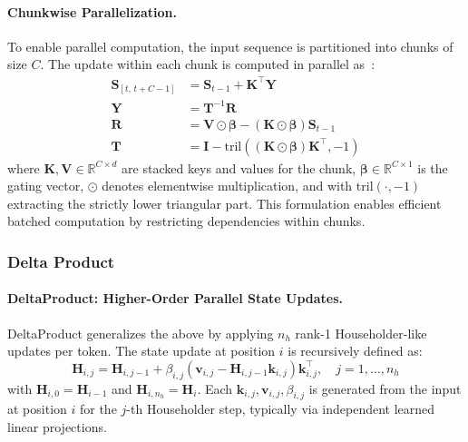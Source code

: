 \documentclass[10pt,a4paper]{article}
\begin{document}
\paragraph{Chunkwise Parallelization.}

To enable parallel computation, the input sequence is partitioned into chunks of size $C$. The update within each chunk is computed in parallel as~\cite{yang2024parallelizing}:
\begin{align}
    \mathbf{S}_{[t,\,t+C-1]} &= \mathbf{S}_{t-1} + \mathbf{K}^\top \mathbf{Y} \\
    \mathbf{Y} &= \mathbf{T}^{-1} \mathbf{R} \\
    \mathbf{R} &= \mathbf{V} \odot \boldsymbol{\beta} - (\mathbf{K} \odot \boldsymbol{\beta}) \mathbf{S}_{t-1} \\ 
    \mathbf{T} &= \mathbf{I} - \mathrm{tril}\left((\mathbf{K} \odot \boldsymbol{\beta}) \mathbf{K}^\top, -1\right)
\end{align}
where $\mathbf{K}, \mathbf{V} \in \mathbb{R}^{C \times d}$ are stacked keys and values for the chunk, $\boldsymbol{\beta} \in \mathbb{R}^{C \times 1}$ is the gating vector, $\odot$ denotes elementwise multiplication, and with $\mathrm{tril}(\cdot, -1)$ extracting the strictly lower triangular part. This formulation enables efficient batched computation by restricting dependencies within chunks.


\subsubsection{Delta Product}

\paragraph{DeltaProduct: Higher-Order Parallel State Updates.}

DeltaProduct generalizes the above by applying $n_h$ rank-1 Householder-like updates per token. The state update at position $i$ is recursively defined as:
\begin{equation}
    \mathbf{H}_{i, j} = \mathbf{H}_{i, j-1} + \beta_{i, j} \left( \mathbf{v}_{i, j} - \mathbf{H}_{i, j-1} \mathbf{k}_{i, j} \right) \mathbf{k}_{i, j}^\top, \quad j=1,\ldots,n_h
    \label{eq:deltaproduct-recurrence}
\end{equation}
with $\mathbf{H}_{i, 0} = \mathbf{H}_{i-1}$ and $\mathbf{H}_{i, n_h} = \mathbf{H}_i$. Each $\mathbf{k}_{i, j}, \mathbf{v}_{i, j}, \beta_{i, j}$ is generated from the input at position $i$ for the $j$-th Householder step, typically via independent learned linear projections.
\end{document}
